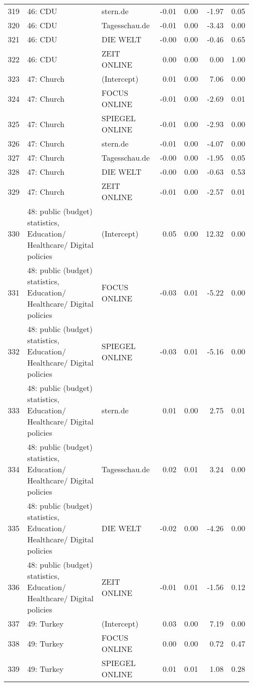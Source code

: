 \begin{table}[ht]
{\begin{tabular}{rllrrrr}
  319 & 46: CDU & stern.de & -0.01 & 0.00 & -1.97 & 0.05 \\ 
  320 & 46: CDU & Tagesschau.de & -0.01 & 0.00 & -3.43 & 0.00 \\ 
  321 & 46: CDU & DIE WELT & -0.00 & 0.00 & -0.46 & 0.65 \\ 
  322 & 46: CDU & ZEIT ONLINE & 0.00 & 0.00 & 0.00 & 1.00 \\ 
  323 & 47: Church & (Intercept) & 0.01 & 0.00 & 7.06 & 0.00 \\ 
  324 & 47: Church & FOCUS ONLINE & -0.01 & 0.00 & -2.69 & 0.01 \\ 
  325 & 47: Church & SPIEGEL ONLINE & -0.01 & 0.00 & -2.93 & 0.00 \\ 
  326 & 47: Church & stern.de & -0.01 & 0.00 & -4.07 & 0.00 \\ 
  327 & 47: Church & Tagesschau.de & -0.00 & 0.00 & -1.95 & 0.05 \\ 
  328 & 47: Church & DIE WELT & -0.00 & 0.00 & -0.63 & 0.53 \\ 
  329 & 47: Church & ZEIT ONLINE & -0.01 & 0.00 & -2.57 & 0.01 \\ 
  330 & 48: public (budget) statistics, Education/ Healthcare/ Digital policies & (Intercept) & 0.05 & 0.00 & 12.32 & 0.00 \\ 
  331 & 48: public (budget) statistics, Education/ Healthcare/ Digital policies & FOCUS ONLINE & -0.03 & 0.01 & -5.22 & 0.00 \\ 
  332 & 48: public (budget) statistics, Education/ Healthcare/ Digital policies & SPIEGEL ONLINE & -0.03 & 0.01 & -5.16 & 0.00 \\ 
  333 & 48: public (budget) statistics, Education/ Healthcare/ Digital policies & stern.de & 0.01 & 0.00 & 2.75 & 0.01 \\ 
  334 & 48: public (budget) statistics, Education/ Healthcare/ Digital policies & Tagesschau.de & 0.02 & 0.01 & 3.24 & 0.00 \\ 
  335 & 48: public (budget) statistics, Education/ Healthcare/ Digital policies & DIE WELT & -0.02 & 0.00 & -4.26 & 0.00 \\ 
  336 & 48: public (budget) statistics, Education/ Healthcare/ Digital policies & ZEIT ONLINE & -0.01 & 0.01 & -1.56 & 0.12 \\ 
  337 & 49: Turkey & (Intercept) & 0.03 & 0.00 & 7.19 & 0.00 \\ 
  338 & 49: Turkey & FOCUS ONLINE & 0.00 & 0.00 & 0.72 & 0.47 \\ 
  339 & 49: Turkey & SPIEGEL ONLINE & 0.01 & 0.01 & 1.08 & 0.28 \\ 

\end{tabular}}
\end{table}
